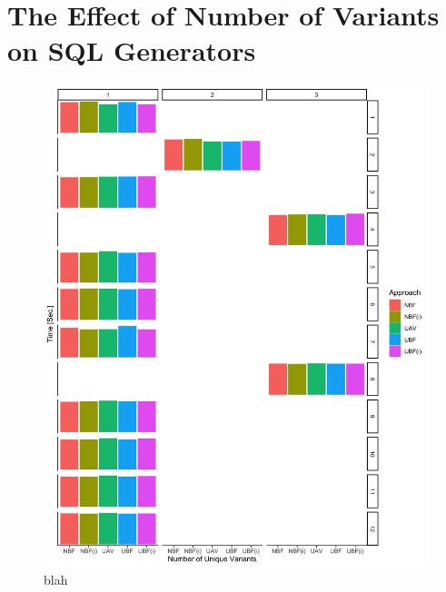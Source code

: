 \section{The Effect of Number of Variants on SQL Generators}
\label{sec:exp-vars}




\begin{figure}
\centering
\includegraphics[scale = 0.1] {figs/plots/emp-comp-var.png}
\caption[blah]{blah}
\label{fig:-}
\end{figure}

